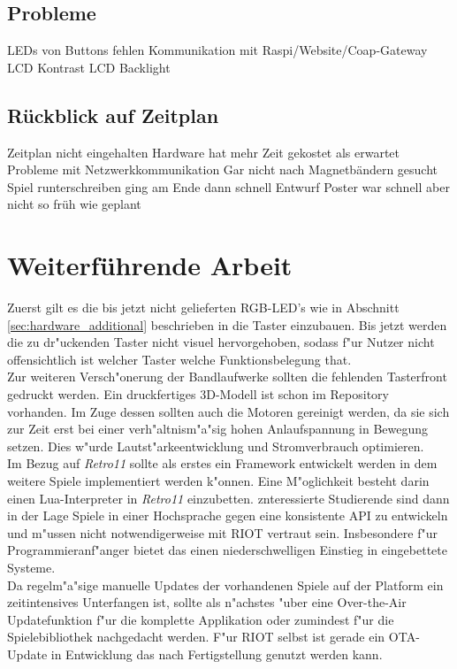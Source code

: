 \documentclass[a4paper]{article}
\begin{document}
  \subsection{Probleme}
  LEDs von Buttons fehlen
  Kommunikation mit Raspi/Website/Coap-Gateway
  LCD Kontrast
  LCD Backlight
  \subsection{Rückblick auf Zeitplan}
  Zeitplan nicht eingehalten
  Hardware hat mehr Zeit gekostet als erwartet
  Probleme mit Netzwerkkommunikation
  Gar nicht nach Magnetbändern gesucht
  Spiel runterschreiben ging am Ende dann schnell
  Entwurf Poster war schnell aber nicht so früh wie geplant

\section{Weiterführende Arbeit}
  \label{sec:further}
  Zuerst gilt es die bis jetzt nicht gelieferten RGB-LED's wie in Abschnitt
  \ref{sec:hardware_additional} beschrieben in die Taster einzubauen. Bis
  jetzt werden die zu dr"uckenden Taster nicht visuel hervorgehoben, sodass
  f"ur Nutzer nicht offensichtlich ist welcher Taster welche Funktionsbelegung
  that.\\
  Zur weiteren Versch"onerung der Bandlaufwerke sollten die fehlenden
  Tasterfront gedruckt werden. Ein druckfertiges 3D-Modell ist schon im
  Repository vorhanden. Im Zuge dessen sollten auch die Motoren gereinigt
  werden, da sie sich zur Zeit erst bei einer verh"altnism"a"sig hohen
  Anlaufspannung in Bewegung setzen. Dies w"urde Lautst"arkeentwicklung und
  Stromverbrauch optimieren.\\
  Im Bezug auf \textit{Retro11} sollte als erstes ein Framework entwickelt
  werden in dem weitere Spiele implementiert werden k"onnen.
  Eine M"oglichkeit besteht darin einen Lua-Interpreter in \textit{Retro11}
  einzubetten. znteressierte Studierende sind dann in der Lage Spiele in einer
  Hochsprache gegen eine konsistente API zu entwickeln und m"ussen nicht
  notwendigerweise mit RIOT vertraut sein. Insbesondere f"ur Programmieranf"anger
  bietet das einen niederschwelligen Einstieg in eingebettete Systeme.\\
  Da regelm"a"sige manuelle Updates der vorhandenen Spiele auf der
  Platform ein zeitintensives Unterfangen ist, sollte als n"achstes "uber eine
  Over-the-Air Updatefunktion f"ur die komplette Applikation oder zumindest
  f"ur die Spielebibliothek nachgedacht werden. F"ur RIOT selbst ist gerade ein
  OTA-Update in Entwicklung das nach Fertigstellung genutzt werden kann.\\\\
\end{document}
